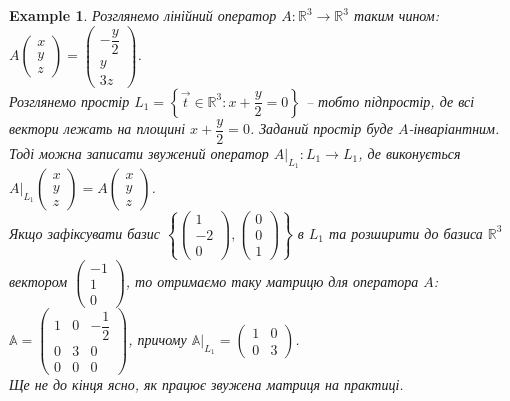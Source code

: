 \documentclass[a4paper, 10pt]{article}
\theoremstyle{theoremdd}
\newtheorem{example}[theorem]{Example}
\begin{document}
\iffalse
\begin{example}
Розглянемо лінійний оператор $A: \mathbb{R}^3 \to \mathbb{R}^3$ таким чином:\\
$A \begin{pmatrix}
x \\ y \\ z
\end{pmatrix} = \begin{pmatrix}
-\dfrac{y}{2} \\ y \\ 3z
\end{pmatrix}$.\\
Розглянемо простір $L_1 = \left\{ \vec{t} \in \mathbb{R}^3 : x + \dfrac{y}{2} = 0 \right\}$ -- тобто підпростір, де всі вектори лежать на площині $x + \dfrac{y}{2} = 0$. Заданий простір буде $A$-інваріантним.\\
Тоді можна записати звужений оператор $A|_{L_1}: L_1 \to L_1$, де виконується $A|_{L_1} \begin{pmatrix}
x \\ y \\ z
\end{pmatrix} = A\begin{pmatrix}
x \\ y \\ z
\end{pmatrix}$.\\
Якщо зафіксувати базис $\left\{ \begin{pmatrix}
1 \\ -2 \\ 0
\end{pmatrix}, \begin{pmatrix}
0 \\ 0 \\ 1
\end{pmatrix} \right\}$ в $L_1$ та розширити до базиса $\mathbb{R}^3$ вектором $\begin{pmatrix}
-1 \\ 1 \\ 0
\end{pmatrix}$, то отримаємо таку матрицю для оператора $A$:\\
$\mathbb{A} = \begin{pmatrix}
1 & 0 & -\dfrac{1}{2} \\
0 & 3 & 0 \\
0 & 0 & 0
\end{pmatrix}$, причому $\mathbb{A}|_{L_1} = \begin{pmatrix}
1 & 0 \\
0 & 3
\end{pmatrix}$.\\
\textit{Ще не до кінця ясно, як працює звужена матриця на практиці.}
\end{example}
\end{document}
